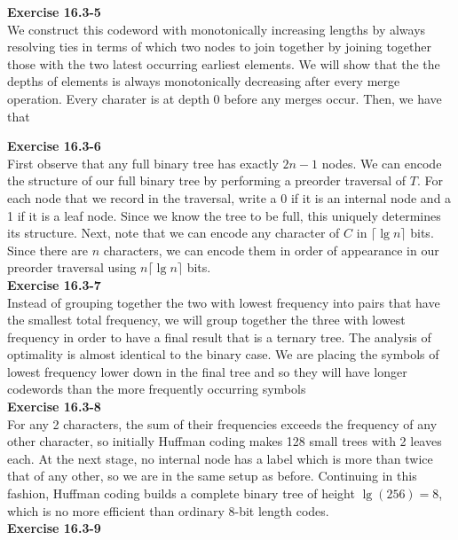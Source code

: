 \documentclass{article}
\begin{document}
\noindent\textbf{Exercise 16.3-5}\\
We construct this codeword with monotonically increasing lengths by always resolving ties in terms of which two nodes to join together by joining together those with the two latest occurring earliest elements. We will show that the the depths of elements is always monotonically decreasing after every merge operation. Every charater is at depth 0 before any merges occur. Then, we have that 

\noindent\textbf{Exercise 16.3-6}\\

First observe that any full binary tree has exactly $2n-1$ nodes.  We can encode the structure of our full binary tree by performing a preorder traversal of $T$.  For each node that we record in the traversal, write a 0 if it is an internal node and a 1 if it is a leaf node. Since we know the tree to be full, this uniquely determines its structure.  Next, note that we can encode any character of $C$ in $\lceil \lg n \rceil$ bits. Since there are $n$ characters, we can encode them in order of appearance in our preorder traversal using $n\lceil \lg n \rceil$ bits. \\

\noindent\textbf{Exercise 16.3-7}\\

Instead of grouping together the two with lowest frequency into pairs that have the smallest total frequency, we will group together the three with lowest frequency in order to have a final result that is a ternary tree. The analysis of optimality is almost identical to the binary case. We are placing the symbols of lowest frequency lower down in the final tree and so they will have longer codewords than the more frequently occurring symbols\\

\noindent\textbf{Exercise 16.3-8}\\

For any 2 characters, the sum of their frequencies exceeds the frequency of any other character, so initially Huffman coding makes 128 small trees with 2 leaves each.  At the next stage, no internal node has a label which is more than twice that of any other, so we are in the same setup as before.  Continuing in this fashion, Huffman coding builds a complete binary tree of height $\lg(256) = 8$, which is no more efficient than ordinary 8-bit length codes. \\

\noindent\textbf{Exercise 16.3-9}\\
\end{document}
